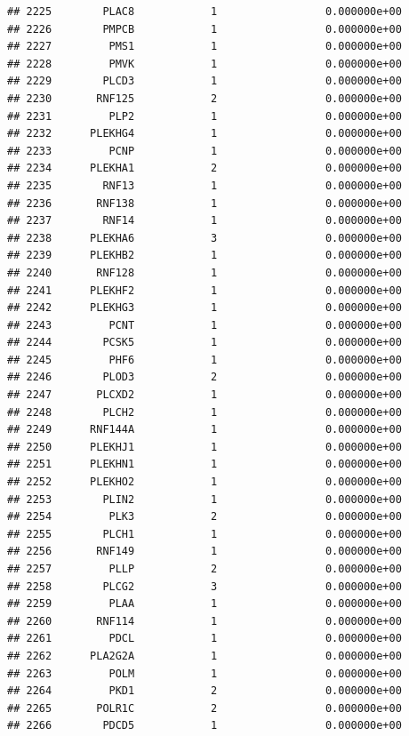 \documentclass[
]{article}
\begin{document}
\begin{verbatim}
## 2225        PLAC8            1                 0.000000e+00
## 2226        PMPCB            1                 0.000000e+00
## 2227         PMS1            1                 0.000000e+00
## 2228         PMVK            1                 0.000000e+00
## 2229        PLCD3            1                 0.000000e+00
## 2230       RNF125            2                 0.000000e+00
## 2231         PLP2            1                 0.000000e+00
## 2232      PLEKHG4            1                 0.000000e+00
## 2233         PCNP            1                 0.000000e+00
## 2234      PLEKHA1            2                 0.000000e+00
## 2235        RNF13            1                 0.000000e+00
## 2236       RNF138            1                 0.000000e+00
## 2237        RNF14            1                 0.000000e+00
## 2238      PLEKHA6            3                 0.000000e+00
## 2239      PLEKHB2            1                 0.000000e+00
## 2240       RNF128            1                 0.000000e+00
## 2241      PLEKHF2            1                 0.000000e+00
## 2242      PLEKHG3            1                 0.000000e+00
## 2243         PCNT            1                 0.000000e+00
## 2244        PCSK5            1                 0.000000e+00
## 2245         PHF6            1                 0.000000e+00
## 2246        PLOD3            2                 0.000000e+00
## 2247       PLCXD2            1                 0.000000e+00
## 2248        PLCH2            1                 0.000000e+00
## 2249      RNF144A            1                 0.000000e+00
## 2250      PLEKHJ1            1                 0.000000e+00
## 2251      PLEKHN1            1                 0.000000e+00
## 2252      PLEKHO2            1                 0.000000e+00
## 2253        PLIN2            1                 0.000000e+00
## 2254         PLK3            2                 0.000000e+00
## 2255        PLCH1            1                 0.000000e+00
## 2256       RNF149            1                 0.000000e+00
## 2257         PLLP            2                 0.000000e+00
## 2258        PLCG2            3                 0.000000e+00
## 2259         PLAA            1                 0.000000e+00
## 2260       RNF114            1                 0.000000e+00
## 2261         PDCL            1                 0.000000e+00
## 2262      PLA2G2A            1                 0.000000e+00
## 2263         POLM            1                 0.000000e+00
## 2264         PKD1            2                 0.000000e+00
## 2265       POLR1C            2                 0.000000e+00
## 2266        PDCD5            1                 0.000000e+00

\end{verbatim}
\end{document}
